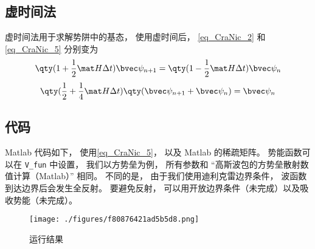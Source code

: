 \subsection{虚时间法}
虚时间法用于求解势阱中的基态， 使用虚时间后， \autoref{eq_CraNic_2} 和\autoref{eq_CraNic_5} 分别变为
\begin{equation}
\qty(1+\frac12\mat H\Delta t)\bvec\psi_{n+1} = \qty(1-\frac12\mat H\Delta t)\bvec\psi_n
\end{equation}
\begin{equation}
\qty(\frac12 + \frac14\mat H\Delta t)\qty(\bvec\psi_{n+1}+\bvec\psi_n) = \bvec\psi_n
\end{equation}

\subsection{代码}
Matlab 代码如下， 使用\autoref{eq_CraNic_5}， 以及 Matlab 的稀疏矩阵。 势能函数可以在 \verb|V_fun| 中设置， 我们以方势垒为例， 所有参数和 “高斯波包的方势垒散射数值计算（Matlab）” 相同。 不同的是， 由于我们使用迪利克雷边界条件， 波函数到达边界后会发生全反射。 要避免反射， 可以用开放边界条件（未完成）以及吸收势能（未完成）。

\begin{figure}[ht]
\centering
\texttt{[image: ./figures/f80876421ad5b5d8.png]}
\caption{运行结果} \label{fig_CraNic_1}
\end{figure}

